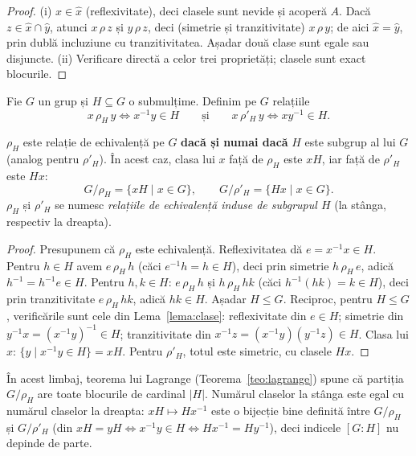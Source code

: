 \begin{proof}
(i) $x\in\widehat x$ (reflexivitate), deci clasele sunt nevide și acoperă $A$. Dacă $z\in\widehat x\cap\widehat y$, atunci $x\,\rho\,z$ și $y\,\rho\,z$, deci (simetrie și tranzitivitate) $x\,\rho\,y$; de aici $\widehat x=\widehat y$, prin dublă incluziune cu tranzitivitatea. Așadar două clase sunt egale sau disjuncte. (ii) Verificare directă a celor trei proprietăți; clasele sunt exact blocurile.
\end{proof}

\begin{definitie}
Fie $G$ un grup și $H\subseteq G$ o submulțime. Definim pe $G$ relațiile
\[
x\,\rho_H\,y\iff x^{-1}y\in H\qquad\text{și}\qquad x\,\rho'_H\,y\iff xy^{-1}\in H .
\]
\end{definitie}

\begin{propozitie}\label{prop:rhoH}
$\rho_H$ este relație de echivalență pe $G$ \textbf{dacă și numai dacă} $H$ este subgrup al lui $G$ (analog pentru $\rho'_H$). În acest caz, clasa lui $x$ față de $\rho_H$ este $xH$, iar față de $\rho'_H$ este $Hx$:
\[
G/\rho_H=\{xH\mid x\in G\},\qquad G/\rho'_H=\{Hx\mid x\in G\}.
\]
$\rho_H$ și $\rho'_H$ se numesc \emph{relațiile de echivalență induse de subgrupul $H$} (la stânga, respectiv la dreapta).
\end{propozitie}

\begin{proof}
Presupunem că $\rho_H$ este echivalență. Reflexivitatea dă $e=x^{-1}x\in H$. Pentru $h\in H$ avem $e\,\rho_H\,h$ (căci $e^{-1}h=h\in H$), deci prin simetrie $h\,\rho_H\,e$, adică $h^{-1}=h^{-1}e\in H$. Pentru $h,k\in H$: $e\,\rho_H\,h$ și $h\,\rho_H\,hk$ (căci $h^{-1}(hk)=k\in H$), deci prin tranzitivitate $e\,\rho_H\,hk$, adică $hk\in H$. Așadar $H\le G$.
Reciproc, pentru $H\le G$, verificările sunt cele din Lema~\ref{lema:clase}: reflexivitate din $e\in H$; simetrie din $y^{-1}x=(x^{-1}y)^{-1}\in H$; tranzitivitate din $x^{-1}z=(x^{-1}y)(y^{-1}z)\in H$. Clasa lui $x$: $\{y\mid x^{-1}y\in H\}=xH$. Pentru $\rho'_H$, totul este simetric, cu clasele $Hx$.
\end{proof}

\begin{observatie}
În acest limbaj, teorema lui Lagrange (Teorema~\ref{teo:lagrange}) spune că partiția $G/\rho_H$ are toate blocurile de cardinal $|H|$. Numărul claselor la stânga este egal cu numărul claselor la dreapta: $xH\mapsto Hx^{-1}$ este o bijecție bine definită între $G/\rho_H$ și $G/\rho'_H$ (din $xH=yH\iff x^{-1}y\in H\iff Hx^{-1}=Hy^{-1}$), deci indicele $[G:H]$ nu depinde de parte.
\end{observatie}

